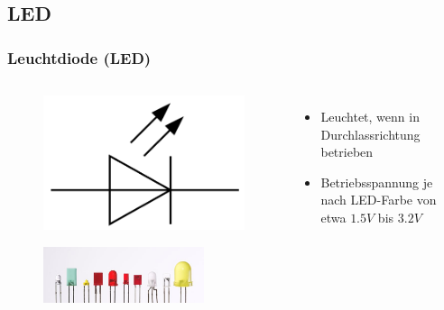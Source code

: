 \subsection*{LED}
\begin{frame}
  \frametitle{Leuchtdiode (LED)}
  \begin{columns}[c]
    \begin{center}
      \begin{figure}
        \includegraphics[width=1\textwidth,height=.15\textheight,keepaspectratio]{a05/Symbol_LED.png}
      \end{figure}
      \begin{figure}
        \includegraphics[width=0.8\textwidth,height=.55\textheight,keepaspectratio]{a05/Verschiedene_LEDs.jpg}
      \end{figure}
    \end{center}
    \begin{itemize}
      \item Leuchtet, wenn in Durchlassrichtung betrieben
      \item Betriebsspannung je nach LED-Farbe von etwa $1.5V$ bis $3.2V$
    \end{itemize}
  \end{columns}
\end{frame}

